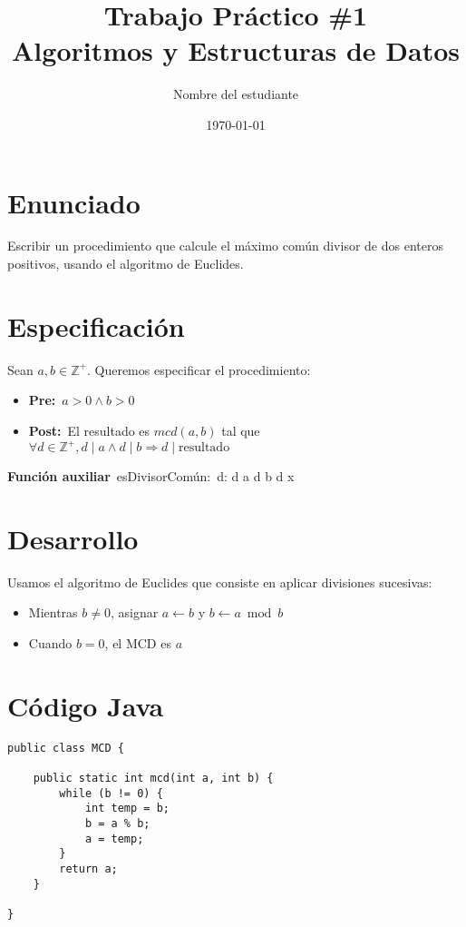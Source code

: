 \documentclass[12pt]{article}
\title{Trabajo Práctico \#1\\\large Algoritmos y Estructuras de Datos}
\author{Nombre del estudiante}
\date{\today}
\newcommand{\Pre}[1]{\textbf{Pre:}~#1}       %
\newcommand{\Post}[1]{\textbf{Post:}~#1}     %
\newcommand{\Func}[2]{\textbf{Función auxiliar}~#1:~#2}  %
\begin{document}
\maketitle

\section{Enunciado}
Escribir un procedimiento que calcule el máximo común divisor de dos enteros positivos, usando el algoritmo de Euclides.

\section{Especificación}


Sean $a, b \in \mathbb{Z}^{+}$. Queremos especificar el procedimiento:

\begin{itemize}
  \item \Pre{$a > 0 \land b > 0$}  %
  \item \Post{El resultado es $mcd(a, b)$ tal que $\forall d \in \mathbb{Z}^{+}, d \mid a \land d \mid b \Rightarrow d \mid \text{resultado}$}  %
\end{itemize}

\Func{esDivisorComún}{\forall d: d \mid a \land d \mid b \Rightarrow d \mid x}

\section{Desarrollo}


Usamos el algoritmo de Euclides que consiste en aplicar divisiones sucesivas:

\begin{itemize}
  \item Mientras $b \neq 0$, asignar $a \leftarrow b$ y $b \leftarrow a \bmod b$
  \item Cuando $b = 0$, el MCD es $a$
\end{itemize}

\section{Código Java}


\begin{lstlisting}
public class MCD {

    public static int mcd(int a, int b) {
        while (b != 0) {
            int temp = b;
            b = a % b;
            a = temp;
        }
        return a;
    }

}
\end{lstlisting}
\end{document}
